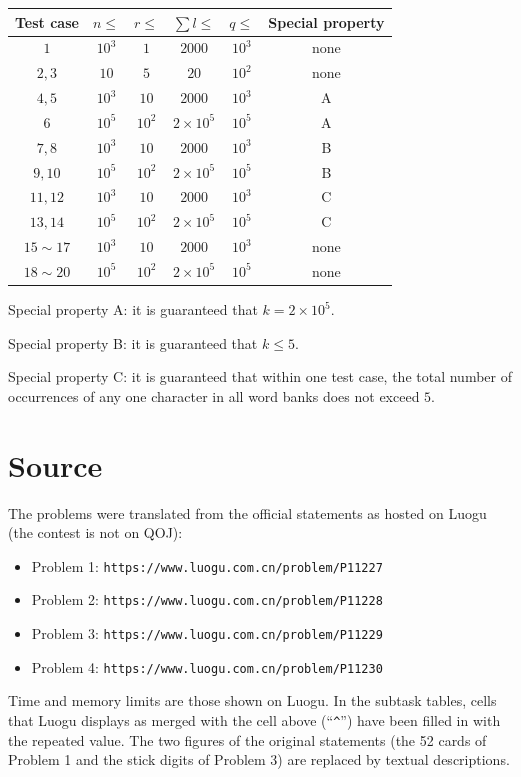 \documentclass[11pt]{article}
\begin{document}
\begin{center}
\begin{tabular}{cccccc}
\toprule
Test case & $n \leq$ & $r \leq$ & $\sum l \leq$ & $q \leq$ & Special property \\
\midrule
$1$ & $10^3$ & $1$ & $2000$ & $10^3$ & none \\
$2, 3$ & $10$ & $5$ & $20$ & $10^2$ & none \\
$4, 5$ & $10^3$ & $10$ & $2000$ & $10^3$ & A \\
$6$ & $10^5$ & $10^2$ & $2 \times 10^5$ & $10^5$ & A \\
$7, 8$ & $10^3$ & $10$ & $2000$ & $10^3$ & B \\
$9, 10$ & $10^5$ & $10^2$ & $2 \times 10^5$ & $10^5$ & B \\
$11, 12$ & $10^3$ & $10$ & $2000$ & $10^3$ & C \\
$13, 14$ & $10^5$ & $10^2$ & $2 \times 10^5$ & $10^5$ & C \\
$15 \sim 17$ & $10^3$ & $10$ & $2000$ & $10^3$ & none \\
$18 \sim 20$ & $10^5$ & $10^2$ & $2 \times 10^5$ & $10^5$ & none \\
\bottomrule
\end{tabular}
\end{center}

Special property A: it is guaranteed that $k = 2 \times 10^5$.

Special property B: it is guaranteed that $k \leq 5$.

Special property C: it is guaranteed that within one test case, the total
number of occurrences of any one character in all word banks does not
exceed $5$.

\section*{Source}

The problems were translated from the official statements as hosted on
Luogu (the contest is not on QOJ):
\begin{itemize}
\item Problem 1: \texttt{https://www.luogu.com.cn/problem/P11227}
\item Problem 2: \texttt{https://www.luogu.com.cn/problem/P11228}
\item Problem 3: \texttt{https://www.luogu.com.cn/problem/P11229}
\item Problem 4: \texttt{https://www.luogu.com.cn/problem/P11230}
\end{itemize}
Time and memory limits are those shown on Luogu.
In the subtask tables, cells that Luogu displays as merged with the cell
above (``\verb|^|'') have been filled in with the repeated value.
The two figures of the original statements (the 52 cards of Problem 1 and
the stick digits of Problem 3) are replaced by textual descriptions.
\end{document}
